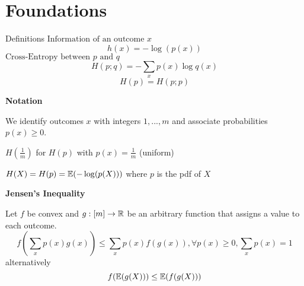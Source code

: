 \section{Foundations}
\begin{mainbox}{Definitions}
    \(\text{Information of an outcome }x\)
    \[h(x) = - \log(p(x))\]
    \(\text{Cross-Entropy between }p \text{ and }q\)
    \[H(p; q) = - \sum_{x}p(x) \log q(x)\]
    \[H(p) = H(p; p) \]
\end{mainbox}    
\textbf{Notation} 

We identify outcomes \(x\) with integers \(1, ..., m\) and associate probabilities \(p(x) \geq 0\).

\(H(\frac{1}{m})\) for \(H(p)\) with \(p(x) = \frac{1}{m}\) (uniform)

\(H(X) = H(p) = \mathbb{E}(-\log(p(X)))\) where \(p\) is the pdf of \(X\)

\vspace*{1mm}
\textbf{Jensen's Inequality}

    Let \(f\) be convex and \(g: [m] \to \mathbb{R}\) be an arbitrary function that assigns a value to each outcome.
    \[f\left(\sum_{x}p(x)g(x)\right) \leq \sum_{x} p(x) f(g(x)), \forall p(x) \geq 0, \sum_x p(x) = 1\]
    alternatively
    \[f(\mathbb{E}(g(X))) \leq \mathbb{E}(f(g(X)))\]


